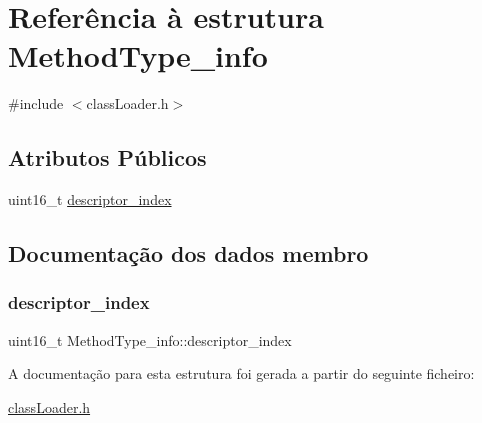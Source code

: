 \hypertarget{struct_method_type__info}{}\section{Referência à estrutura Method\+Type\+\_\+info}
\label{struct_method_type__info}


{\ttfamily \#include $<$class\+Loader.\+h$>$}

\subsection*{Atributos Públicos}
\begin{DoxyCompactItemize}
\item 
uint16\+\_\+t \hyperlink{struct_method_type__info_aee3890935d7888f14b4479671c270ed2}{descriptor\+\_\+index}
\end{DoxyCompactItemize}


\subsection{Documentação dos dados membro}
\hypertarget{struct_method_type__info_aee3890935d7888f14b4479671c270ed2}{}\label{struct_method_type__info_aee3890935d7888f14b4479671c270ed2} 
\subsubsection{\texorpdfstring{descriptor\+\_\+index}{descriptor\_index}}
{\footnotesize\ttfamily uint16\+\_\+t Method\+Type\+\_\+info\+::descriptor\+\_\+index}



A documentação para esta estrutura foi gerada a partir do seguinte ficheiro\+:\begin{DoxyCompactItemize}
\item 
\hyperlink{class_loader_8h}{class\+Loader.\+h}\end{DoxyCompactItemize}
